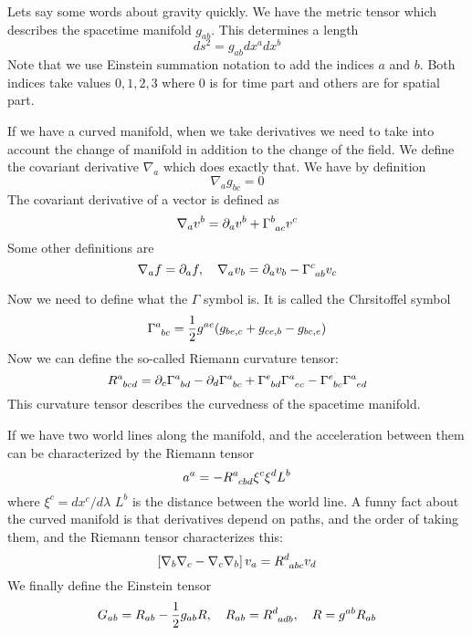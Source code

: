 \documentclass[letterpaper, 11pt]{article}
\numberwithin{equation}{section}
\numberwithin{figure}{section}
\begin{document}
Lets say some words about gravity quickly. We have the metric tensor which
describes the spacetime manifold $g_{ab}$. This determines a length
\begin{equation}
  \label{eq:7}
  ds^2 = g_{ab}dx^adx^{b}
\end{equation}
Note that we use Einstein summation notation to add the indices $a$ and $b$.
Both indices take values $0, 1, 2, 3$ where $0$ is for time part and others are
for spatial part.

If we have a curved manifold, when we take derivatives we need to take into
account the change of manifold in addition to the change of the field. We define
the covariant derivative $\nabla_{a}$ which does exactly that. We have by definition
\begin{equation}
  \label{eq:8}
  \nabla_ag_{bc} = 0
\end{equation}
The covariant derivative of a vector is defined as
\begin{equation}
  \label{eq:9}
  \nabla_av^b = \partial_av^{b} + \tensor{\Gamma}{^{b}_{ac}}v^{c}
\end{equation}
Some other definitions are
\begin{equation}
  \label{eq:10}
  \nabla_a f = \partial_{a}f,\quad \nabla_av_{b} = \partial_av_{b} - \tensor{\Gamma}{^{c}_{ab}}v_{c}
\end{equation}

Now we need to define what the $\Gamma$ symbol is. It is called the Chrsitoffel
symbol
\begin{equation}
  \label{eq:11}
  \tensor{\Gamma}{^{a}_{bc}} = \frac{1}{2}g^{ae}(g_{be,c} + g_{ce,b} - g_{bc,e})
\end{equation}
Now we can define the so-called Riemann curvature tensor:
\begin{equation}
  \label{eq:12}
  \tensor{R}{^a_{bcd}} = \partial_{c}\tensor{\Gamma}{^a_{bd}} - \partial_{d}\tensor{\Gamma}{^a_{bc}} + \tensor{\Gamma}{^{e}_{bd}}\tensor{\Gamma}{^{a}_{ec}} - \tensor{\Gamma}{^{e}_{bc}}\tensor{\Gamma}{^{a}_{ed}}
\end{equation}
This curvature tensor describes the curvedness of the spacetime manifold.

If we have two world lines along the manifold, and the acceleration between them
can be characterized by the Riemann tensor
\begin{equation}
  \label{eq:13}
  a^a = -\tensor{R}{^{a}_{cbd}}\xi^{c}\xi^dL^{b}
\end{equation}
where $\xi^{c} = dx^{c}/d\lambda$ $L^{b}$ is the distance between the world
line. A funny fact about the curved manifold is that derivatives depend on
paths, and the order of taking them, and the Riemann tensor characterizes this:
\begin{equation}
  \label{eq:14}
  \left[ \nabla_{b}\nabla_{c} - \nabla_{c}\nabla_{b} \right] v_{a} = \tensor{R}{^{d}_{abc}}v_{d}
\end{equation}
We finally define the Einstein tensor
\begin{equation}
  \label{eq:15}
  G_{ab} = R_{ab} - \frac{1}{2}g_{ab}R,\quad R_{ab} = \tensor{R}{^{d}_{adb}},\quad R = g^{ab}R_{ab}
\end{equation}
\end{document}
